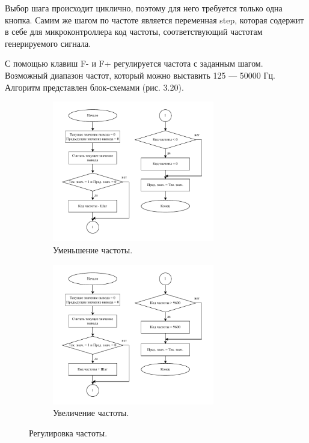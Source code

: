 	
	Выбор шага происходит циклично, поэтому для него требуется только одна кнопка. Самим же шагом по частоте является переменная step, которая содержит в себе для микроконтроллера код частоты, соответствующий частотам генерируемого сигнала.
	
	С помощью клавиш F- и F+ регулируется частота с заданным шагом. Возможный диапазон частот, который можно выставить 125 --- 50000 Гц. Алгоритм представлен блок-схемами (рис. 3.20).
	
	\begin{figure}[H]\captionsetup[subfigure]{font=normalsize}
     \begin{subfigure}[H]{1\textwidth}
         \centering
         \includegraphics[width=0.775\textwidth]{../image/minus_freq.pdf}
         \caption{Уменьшение частоты.}
     \end{subfigure}
     \hfill
     \begin{subfigure}[H]{1\textwidth}
         \centering
         \includegraphics[width=0.775\textwidth]{../image/plus_freq.pdf}
         \caption{Увеличение частоты.}
     \end{subfigure}
        \caption{Регулировка частоты.}
	\end{figure}
	
